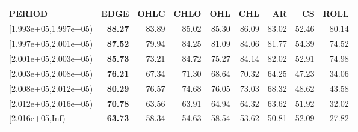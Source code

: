 \begin{table}[ht]
\centering
\begin{tabular}{lrrrrrrrr}
  \hline
PERIOD & EDGE & OHLC & CHLO & OHL & CHL & AR & CS & ROLL \\ 
  \hline
[1.993e+05,1.997e+05) & \textbf{88.27} & 83.89 & 85.02 & 85.30 & 86.09 & 83.02 & 52.46 & 80.14 \\ 
  [1.997e+05,2.001e+05) & \textbf{87.52} & 79.94 & 84.25 & 81.09 & 84.06 & 81.77 & 54.39 & 74.52 \\ 
  [2.001e+05,2.003e+05) & \textbf{85.73} & 73.21 & 84.72 & 75.27 & 84.14 & 82.02 & 52.91 & 74.98 \\ 
  [2.003e+05,2.008e+05) & \textbf{76.21} & 67.34 & 71.30 & 68.64 & 70.32 & 64.25 & 47.23 & 34.06 \\ 
  [2.008e+05,2.012e+05) & \textbf{80.29} & 76.57 & 74.68 & 76.05 & 73.03 & 68.32 & 48.62 & 43.58 \\ 
  [2.012e+05,2.016e+05) & \textbf{70.78} & 63.56 & 63.91 & 64.94 & 64.32 & 63.62 & 51.92 & 32.02 \\ 
  [2.016e+05,Inf) & \textbf{63.73} & 58.34 & 54.63 & 58.54 & 53.62 & 50.81 & 52.09 & 27.82 \\ 
   \hline
\end{tabular}
\end{table}
